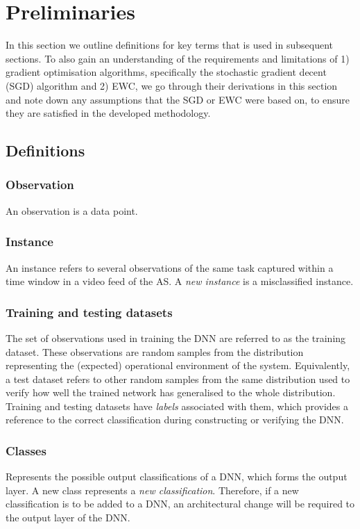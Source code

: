 \section{Preliminaries}\label{sec:preliminaries}
In this section we outline definitions for key terms that is used in subsequent sections.
%
To also gain an understanding of the requirements and limitations of 1) gradient optimisation algorithms, specifically the stochastic gradient decent (SGD) algorithm and 2) EWC, we go through their derivations in this section and note down any assumptions that the SGD or EWC were based on, to ensure they are satisfied in the developed methodology. 

\subsection{Definitions} \label{definitions}
\subsubsection{Observation}
An observation is a data point. 

\subsubsection{Instance}
An instance refers to several observations of the same task captured within a time window in a video feed of the AS.
%
A \textit{new instance} is a misclassified instance.

\subsubsection{Training and testing datasets}
The set of observations used in training the DNN are referred to as the training dataset.
%
These observations are random samples from the distribution representing the (expected) operational environment of the system.
%
Equivalently, a test dataset refers to other random samples from the same distribution used to verify how well the trained network has generalised to the whole distribution.
%
Training and testing datasets have \textit{labels} associated with them, which provides a reference to the correct classification during constructing or verifying the DNN.

\subsubsection{Classes}
Represents the possible output classifications of a DNN, which forms the output layer.
%
A new class represents a \textit{new classification}. 
%
Therefore, if a new classification is to be added to a DNN, an architectural change will be required to the output layer of the DNN.

